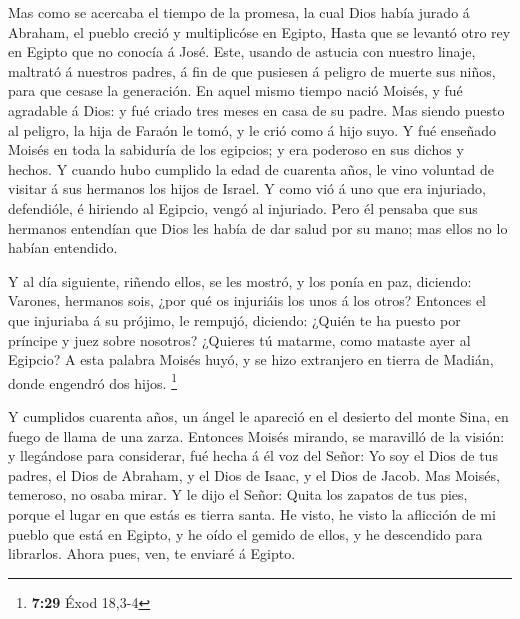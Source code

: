  Mas como se acercaba el tiempo de la promesa, la cual
Dios había jurado á Abraham, el pueblo creció y multiplicóse en Egipto,
 Hasta que se levantó otro rey en Egipto que no conocía á
José.  Este, usando de astucia con nuestro linaje,
maltrató á nuestros padres, á fin de que pusiesen á peligro de muerte
sus niños, para que cesase la generación.  En aquel mismo
tiempo nació Moisés, y fué agradable á Dios: y fué criado tres meses en
casa de su padre.  Mas siendo puesto al peligro, la hija
de Faraón le tomó, y le crió como á hijo suyo.  Y fué
enseñado Moisés en toda la sabiduría de los egipcios; y era poderoso en
sus dichos y hechos.  Y cuando hubo cumplido la edad de
cuarenta años, le vino voluntad de visitar á sus hermanos los hijos de
Israel.  Y como vió á uno que era injuriado, defendióle,
é hiriendo al Egipcio, vengó al injuriado.  Pero él
pensaba que sus hermanos entendían que Dios les había de dar salud por
su mano; mas ellos no lo habían entendido.

 Y al día siguiente, riñendo ellos, se les mostró, y los
ponía en paz, diciendo: Varones, hermanos sois, ¿por qué os injuriáis
los unos á los otros?  Entonces el que injuriaba á su
prójimo, le rempujó, diciendo: ¿Quién te ha puesto por príncipe y juez
sobre nosotros?  ¿Quieres tú matarme, como mataste ayer
al Egipcio?  A esta palabra Moisés huyó, y se hizo
extranjero en tierra de Madián, donde engendró dos hijos. \footnote{\textbf{7:29}
  Éxod 18,3-4}

 Y cumplidos cuarenta años, un ángel le apareció en el
desierto del monte Sina, en fuego de llama de una zarza. 
Entonces Moisés mirando, se maravilló de la visión: y llegándose para
considerar, fué hecha á él voz del Señor:  Yo soy el Dios
de tus padres, el Dios de Abraham, y el Dios de Isaac, y el Dios de
Jacob. Mas Moisés, temeroso, no osaba mirar.  Y le dijo
el Señor: Quita los zapatos de tus pies, porque el lugar en que estás es
tierra santa.  He visto, he visto la aflicción de mi
pueblo que está en Egipto, y he oído el gemido de ellos, y he descendido
para librarlos. Ahora pues, ven, te enviaré á Egipto.

